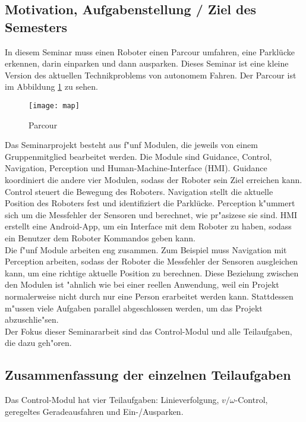     
\subsection{Motivation, Aufgabenstellung / Ziel des Semesters}

In diesem Seminar muss einen Roboter einen Parcour umfahren, eine Parklücke erkennen, darin einparken und dann ausparken. Dieses Seminar ist eine kleine Version des aktuellen Technikproblems von autonomem Fahren. Der Parcour ist im Abbildung \ref{fig:map} zu sehen. \\

\begin{figure}
    \centering
    \texttt{[image: map]}
    \caption{Parcour}
    \label{fig:map}
\end{figure}

Das Seminarprojekt besteht aus f"unf Modulen, die jeweils von einem Gruppenmitglied bearbeitet werden. Die Module sind Guidance, Control, Navigation, Perception und Human-Machine-Interface (HMI). Guidance koordiniert die andere vier Modulen, sodass der Roboter sein Ziel erreichen kann. Control steuert die Bewegung des Roboters. Navigation stellt die aktuelle Position des Roboters fest und identifiziert die Parklücke. Perception k"ummert sich um die Messfehler der Sensoren und berechnet, wie pr"asizese sie sind. HMI erstellt eine Android-App, um ein Interface mit dem Roboter zu haben, sodass ein Benutzer dem Roboter Kommandos geben kann. \\

Die f"unf Module arbeiten eng zusammen. Zum Beispiel muss Navigation mit Perception arbeiten, sodass der Roboter die Messfehler der Sensoren ausgleichen kann, um eine richtige aktuelle Position zu berechnen. Diese Beziehung zwischen den Modulen ist "ahnlich wie bei einer reellen Anwendung, weil ein Projekt normalerweise nicht durch nur eine Person erarbeitet werden kann. Stattdessen m"ussen viele Aufgaben parallel abgeschlossen werden, um das Projekt abzuschlie"sen. \\

Der Fokus dieser Seminararbeit sind das Control-Modul und alle Teilaufgaben, die dazu geh"oren. \\

\subsection{Zusammenfassung der einzelnen Teilaufgaben}

Das Control-Modul hat vier Teilaufgaben: Linieverfolgung, \(v/\omega\)-Control, geregeltes Geradeausfahren und Ein-/Ausparken. \\

